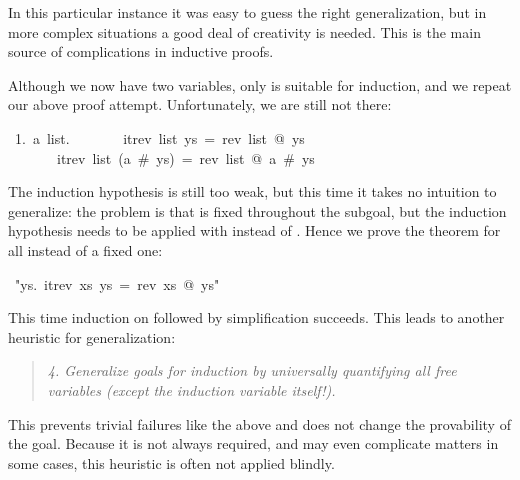 \begin{isabelle}
\begin{isamarkuptxt}
In this particular instance it was easy to guess the right generalization,
but in more complex situations a good deal of creativity is needed. This is
the main source of complications in inductive proofs.

Although we now have two variables, only  is suitable for
induction, and we repeat our above proof attempt. Unfortunately, we are still
not there:
\begin{isabellepar}%
~1.~{\isasymAnd}a~list.\isanewline
~~~~~~~itrev~list~ys~=~rev~list~@~ys~{\isasymLongrightarrow}\isanewline
~~~~~~~itrev~list~(a~\#~ys)~=~rev~list~@~a~\#~ys%
\end{isabellepar}%
The induction hypothesis is still too weak, but this time it takes no
intuition to generalize: the problem is that  is fixed throughout
the subgoal, but the induction hypothesis needs to be applied with
 instead of . Hence we prove the theorem
for all  instead of a fixed one:%
\end{isamarkuptxt}%
\ {"}{\isasymforall}ys.\ itrev\ xs\ ys\ =\ rev\ xs\ @\ ys{"}%
\begin{isamarkuptxt}%
\noindent
This time induction on  followed by simplification succeeds. This
leads to another heuristic for generalization:
\begin{quote}
{\em 4. Generalize goals for induction by universally quantifying all free
variables {\em(except the induction variable itself!)}.}
\end{quote}
This prevents trivial failures like the above and does not change the
provability of the goal. Because it is not always required, and may even
complicate matters in some cases, this heuristic is often not
applied blindly.%
\end{isamarkuptxt}%
\end{isabelle}%

